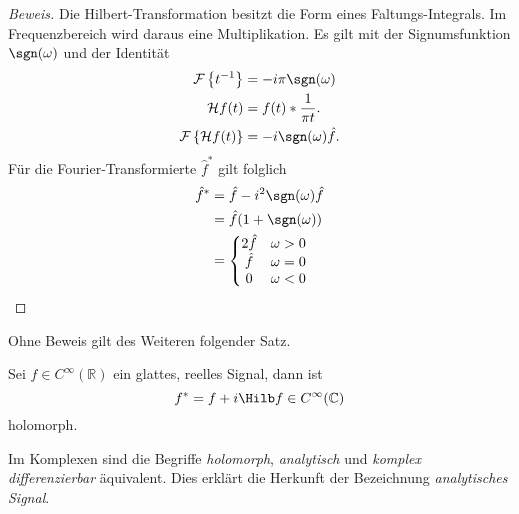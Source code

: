 \begin{proof}[Beweis]
	Die Hilbert-Transformation besitzt die Form eines Faltungs-Integrals.
	Im Frequenzbereich wird daraus eine Multiplikation.
	Es gilt mit der Signumsfunktion $\sgn(\omega)$ und der Identität
	\begin{align*}
		\mathcal{F} \left\lbrace t^{-1}\right\rbrace  &= -i\pi\sgn(\omega) \\
		\mathcal{H} f(t) &= f(t) * \frac{1}{\pi t}. \\
		\mathcal{F}\left\lbrace \mathcal{H}f(t)\right\rbrace &= -i\sgn(\omega) \hat{f}.
	\end{align*}
	Für die Fourier-Transformierte $\hat f^\ast$ gilt folglich 
	\begin{align*}
		\hat{f}^\ast 
		&= \hat{f} - i^2\sgn(\omega)\hat{f}\\
		&= \hat{f}(1 +\sgn(\omega))\\
		&=\left\lbrace\begin{matrix}
			2\hat{f} & \omega > 0\\
			\hat{f} & \omega = 0\\
			0 & \omega < 0
		\end{matrix} \right.\qedhere
	\end{align*}
\end{proof}

Ohne Beweis gilt des Weiteren folgender Satz. %
\begin{satz}
	Sei $f \in C^\infty(\mathbb{R})$ ein glattes, reelles Signal, dann ist 
	\[
		f^\ast = f + i\Hilb f \in C^\infty(\mathbb{C})
	\]
	holomorph.
\end{satz}
Im Komplexen sind die Begriffe \emph{holomorph}, \emph{analytisch} und \emph{komplex differenzierbar} äquivalent.
Dies erklärt die Herkunft der Bezeichnung \emph{analytisches Signal}.